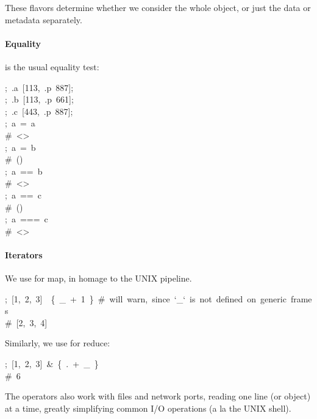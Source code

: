 \documentclass[preprint]{{acmart}}
\begin{document}
These flavors determine whether we consider the whole object, or just the data
or metadata separately.%

\paragraph{Equality}\label{sec-equality}%

\noindent{}\mdcode{=} is the usual equality test:%
\begin{mdpre}%
\noindent;~.a~{}[{113},~.p~{887}];\\
;~.b~{}[{113},~.p~{661}];\\
;~.c~{}[{443},~.p~{887}];\\
;~a~=~a\\
{\#~\textless{}\textgreater{}}\\
;~a~=~b\\
{\#~()}\\
;~a~==~b\\
{\#~\textless{}\textgreater{}}\\
;~a~==~c\\
{\#~()}\\
;~a~===~c\\
{\#~\textless{}\textgreater{}}%
\end{mdpre}
\paragraph{Iterators}\label{sec-iterators}%

\noindent{}We use \mdcode{\textbar{}} for map, in homage to the UNIX pipeline.%
\begin{mdpre}%
\noindent;~{}[1,~2,~3]~\textbar{}~\{~\_~+~1~\}~{\#~will~warn,~since~`\_`~is~not~defined~on~generic~frames}\\
{\#~{}[2,~3,~4]}%
\end{mdpre}\noindent{}Similarly, we use \mdcode{\&} for reduce:
\begin{mdpre}%
\noindent;~{}[1,~2,~3]~\&~\{~.~+~\_~\}\\
{\#~6}%
\end{mdpre}\noindent{}The operators also work with files and network ports, reading one line
(or object) at a time, greatly simplifying common I/O operations (a la
the UNIX shell). 
\end{document}
